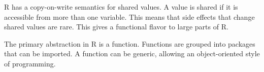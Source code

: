 \documentclass[sigplan,anonymous,review]{acmart}
\begin{document}
\begin{compactitem}[$-$]
\item R has a copy-on-write semantics for shared values. A value is shared if
    it is accessible from more than one variable. This means that side effects
    that change shared values are rare. This gives a functional flavor to large
    parts of R.

\item The primary abstraction in R is a function. Functions are grouped into
    packages that can be imported. A function can be generic, allowing an
    object-oriented style of programming.  

\end{compactitem}

\end{document}
